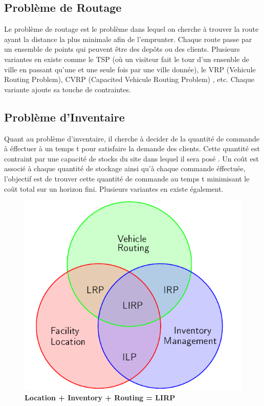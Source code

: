 \documentclass[a4paper,10pt]{article}
\begin{document}
\subsection*{Problème de Routage}
Le problème de routage est le problème dans lequel on cherche à trouver la route ayant la distance la plus minimale afin de l'emprunter. Chaque route 
passe par un ensemble de points qui peuvent être des depôts ou des clients. Plusieurs variantes en existe comme le TSP (où un visiteur fait le tour d'un
ensenble de ville en passant qu'une et une seule fois par une ville donnée), le VRP (Vehicule Routing Problem), CVRP (Capacited Vehicule Routing Problem)
,  etc. Chaque variante ajoute sa touche de contraintes.
\subsection*{Problème d'Inventaire}
Quant au problème d'inventaire, il cherche à decider de la quantité de commande à éffectuer à un temps t pour satisfaire la demande des clients. 
Cette quantité est contraint par une capacité de stocks du site dans lequel il sera posé . Un coût est associé à chaque quantité de stockage ainsi 
qu'à chaque commande éffectuée, l'objectif est de trouver cette quantité de commande au temps t minimisant le coût total sur un horizon fini. Plusieurs variantes en existe également.
\begin{figure}[h]
\includegraphics{lirp.PNG}
\caption{\label{lirp} \textbf{Location + Inventory + Routing = LIRP \cite{}}}
\end{figure}
\end{document}
